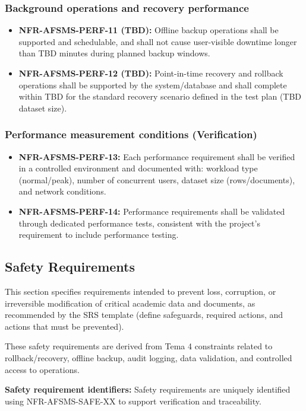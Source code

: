 \documentclass[11pt, a4paper]{article}
\begin{document}
\subsubsection{Background operations and recovery performance}
\begin{itemize}
    \item \textbf{NFR-AFSMS-PERF-11 (TBD):} Offline backup operations shall be supported and schedulable, and shall not cause user-visible downtime longer than TBD minutes during planned backup windows.
    \item \textbf{NFR-AFSMS-PERF-12 (TBD):} Point-in-time recovery and rollback operations shall be supported by the system/database and shall complete within TBD for the standard recovery scenario defined in the test plan (TBD dataset size).
\end{itemize}

\subsubsection{Performance measurement conditions (Verification)}
\begin{itemize}
    \item \textbf{NFR-AFSMS-PERF-13:} Each performance requirement shall be verified in a controlled environment and documented with: workload type (normal/peak), number of concurrent users, dataset size (rows/documents), and network conditions.
    \item \textbf{NFR-AFSMS-PERF-14:} Performance requirements shall be validated through dedicated performance tests, consistent with the project's requirement to include performance testing.
\end{itemize}

\subsection{Safety Requirements}
This section specifies requirements intended to prevent loss, corruption, or irreversible modification of critical academic data and documents, as recommended by the SRS template (define safeguards, required actions, and actions that must be prevented).

These safety requirements are derived from Tema 4 constraints related to rollback/recovery, offline backup, audit logging, data validation, and controlled access to operations.

\textbf{Safety requirement identifiers:}
Safety requirements are uniquely identified using NFR-AFSMS-SAFE-XX to support verification and traceability.
\end{document}
